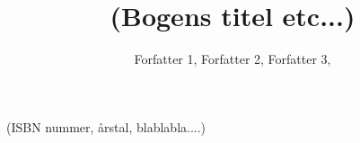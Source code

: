 \documentclass[a5paper,10pt]{book}
\author{Forfatter 1, Forfatter 2, Forfatter 3, }
\title{(Bogens titel etc...)}
\begin{document}
\renewcommand{\chaptername}{eNote}

\maketitle

(ISBN nummer, årstal, blablabla....)


\tableofcontents

\newpage
\end{document}
